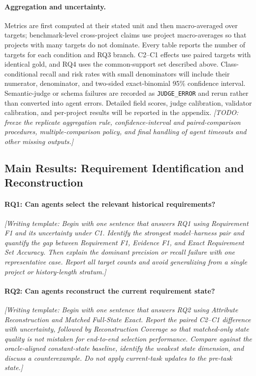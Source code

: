 \documentclass{article} %
\newcommand{\placeholder}[1]{\emph{[#1]}}
\begin{document}
\paragraph{Aggregation and uncertainty.}
Metrics are first computed at their stated unit and then macro-averaged over targets; benchmark-level cross-project claims use project macro-averages so that projects with many targets do not dominate. Every table reports the number of targets for each condition and RQ3 branch. C2--C1 effects use paired targets with identical gold, and RQ4 uses the common-support set described above. Class-conditional recall and risk rates with small denominators will include their numerator, denominator, and two-sided exact-binomial 95\% confidence interval. Semantic-judge or schema failures are recorded as \texttt{JUDGE\_ERROR} and rerun rather than converted into agent errors. Detailed field scores, judge calibration, validator calibration, and per-project results will be reported in the appendix.
\placeholder{TODO: freeze the replicate aggregation rule, confidence-interval and paired-comparison procedures, multiple-comparison policy, and final handling of agent timeouts and other missing outputs.}

\subsection{Main Results: Requirement Identification and Reconstruction}

\paragraph{RQ1: Can agents select the relevant historical requirements?}
\placeholder{Writing template: Begin with one sentence that answers RQ1 using Requirement F1 and its uncertainty under C1. Identify the strongest model--harness pair and quantify the gap between Requirement F1, Evidence F1, and Exact Requirement Set Accuracy. Then explain the dominant precision or recall failure with one representative case. Report all target counts and avoid generalizing from a single project or history-length stratum.}

\paragraph{RQ2: Can agents reconstruct the current requirement state?}
\placeholder{Writing template: Begin with one sentence that answers RQ2 using Attribute Reconstruction and Matched Full-State Exact. Report the paired C2--C1 difference with uncertainty, followed by Reconstruction Coverage so that matched-only state quality is not mistaken for end-to-end selection performance. Compare against the oracle-aligned constant-state baseline, identify the weakest state dimension, and discuss a counterexample. Do not apply current-task updates to the pre-task state.}
\end{document}
